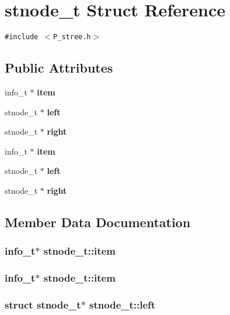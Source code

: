 \section{stnode\_\-t  Struct Reference}
\label{structstnode__t}
{\tt \#include $<$P\_\-stree.h$>$}

\subsection*{Public Attributes}
\begin{CompactItemize}
\item 
info\_\-t $\ast$ {\bf item}
\item 
stnode\_\-t $\ast$ {\bf left}
\item 
stnode\_\-t $\ast$ {\bf right}
\item 
info\_\-t $\ast$ {\bf item}
\item 
stnode\_\-t $\ast$ {\bf left}
\item 
stnode\_\-t $\ast$ {\bf right}
\end{CompactItemize}


\subsection{Member Data Documentation}
\subsubsection{\setlength{\rightskip}{0pt plus 5cm}info\_\-t$\ast$ stnode\_\-t::item}\label{structstnode__t_m3}


\subsubsection{\setlength{\rightskip}{0pt plus 5cm}info\_\-t$\ast$ stnode\_\-t::item}\label{structstnode__t_m0}


\subsubsection{\setlength{\rightskip}{0pt plus 5cm}struct stnode\_\-t$\ast$ stnode\_\-t::left}\label{structstnode__t_m4}


